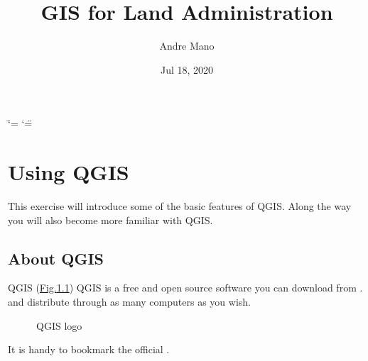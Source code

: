 \documentclass[letterpaper,10pt,english]{sphinxmanual}
\title{GIS for Land Administration}
\date{Jul 18, 2020}
\author{Andre Mano}
\begin{document}
\ifdefined\shorthandoff
  \ifnum\catcode`\=\string=\active\shorthandoff{=}\fi
  \ifnum\catcode`\"=\active{}\fi
\fi

\pagestyle{empty}
\sphinxmaketitle
\pagestyle{plain}
\sphinxtableofcontents
\pagestyle{normal}
\label{\detokenize{index::doc}}



\chapter{Using QGIS}
\label{\detokenize{using_qgis:using-qgis}}\label{\detokenize{using_qgis::doc}}
This exercise will introduce some of the basic features of QGIS. Along the way you will also become more familiar with QGIS.


\section{About QGIS}
\label{\detokenize{using_qgis:about-qgis}}
QGIS (\hyperref[\detokenize{using_qgis:qgis-logo}]{Fig.\@ \ref{\detokenize{using_qgis:qgis-logo}}}) QGIS is a free and open source software you can download from . and distribute through as many computers as you wish.

\begin{figure}[htbp]
\centering
\capstart

\noindent{}
\caption{QGIS logo}\label{\detokenize{using_qgis:id1}}\label{\detokenize{using_qgis:qgis-logo}}\end{figure}

It is handy to bookmark the official .
\end{document}
